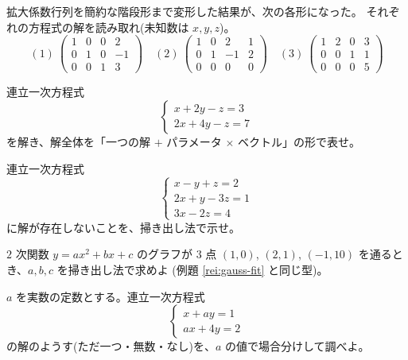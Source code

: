 \begin{mondai}[基本]\label{q:gauss-ex3}
拡大係数行列を簡約な階段形まで変形した結果が、次の各形になった。
それぞれの方程式の解を読み取れ(未知数は $x, y, z$)。
\[
(1)\ \left(\begin{array}{ccc|c}
1 & 0 & 0 & 2 \\
0 & 1 & 0 & -1 \\
0 & 0 & 1 & 3
\end{array}\right)
\quad
(2)\ \left(\begin{array}{ccc|c}
1 & 0 & 2 & 1 \\
0 & 1 & -1 & 2 \\
0 & 0 & 0 & 0
\end{array}\right)
\quad
(3)\ \left(\begin{array}{ccc|c}
1 & 2 & 0 & 3 \\
0 & 0 & 1 & 1 \\
0 & 0 & 0 & 5
\end{array}\right)
\]
\end{mondai}

\begin{mondai}[基本]\label{q:gauss-ex4}
連立一次方程式
\[
\begin{cases}
x + 2y - z = 3 \\
2x + 4y - z = 7
\end{cases}
\]
を解き、解全体を「一つの解 $+$ パラメータ $\times$ ベクトル」の形で表せ。
\end{mondai}

\begin{mondai}[標準]\label{q:gauss-ex5}
連立一次方程式
\[
\begin{cases}
x - y + z = 2 \\
2x + y - 3z = 1 \\
3x - 2z = 4
\end{cases}
\]
に解が存在しないことを、掃き出し法で示せ。
\end{mondai}

\begin{mondai}[標準]\label{q:gauss-ex6}
$2$ 次関数 $y = ax^2 + bx + c$ のグラフが $3$ 点 $(1, 0)$, $(2, 1)$,
$(-1, 10)$ を通るとき、$a, b, c$ を掃き出し法で求めよ
(例題 \ref{rei:gauss-fit} と同じ型)。
\end{mondai}

\begin{mondai}[標準]\label{q:gauss-ex7}
$a$ を実数の定数とする。連立一次方程式
\[
\begin{cases}
x + ay = 1 \\
ax + 4y = 2
\end{cases}
\]
の解のようす(ただ一つ・無数・なし)を、$a$ の値で場合分けして調べよ。
\end{mondai}

